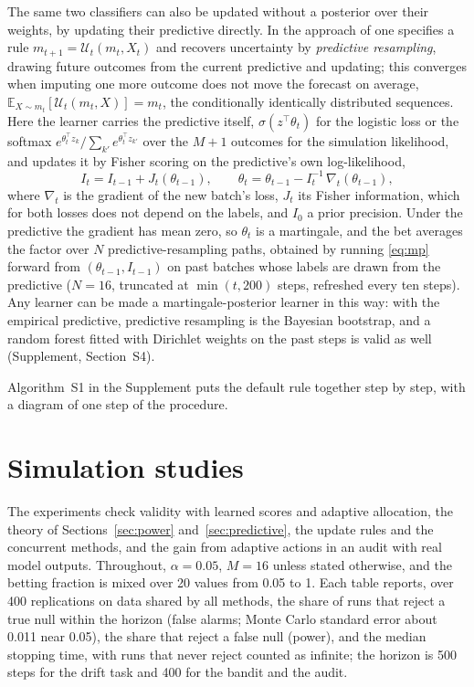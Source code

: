 \documentclass[12pt]{article}
\newcommand{\E}{\mathbb{E}}
\theoremstyle{remark}
\begin{document}
The same two classifiers can also be updated without a posterior over their
weights, by updating their predictive directly. In the approach of
\citet{fong2023martingale} one specifies a rule
$m_{t+1} = \mathcal U_t(m_t, X_t)$ and recovers uncertainty by
\emph{predictive resampling}, drawing future outcomes from the current
predictive and updating; this converges when imputing one more outcome does
not move the forecast on average, $\E_{X \sim m_t}[\mathcal U_t(m_t, X)] = m_t$,
the conditionally identically distributed sequences.
Here the learner carries the predictive itself, $\sigma(z^\top\theta_t)$ for
the logistic loss or the softmax $e^{\theta_t^\top z_k}/\sum_{k'} e^{\theta_t^\top z_{k'}}$
over the $M+1$ outcomes for the simulation likelihood, and updates it by
Fisher scoring on the predictive's own log-likelihood,
\begin{equation}\label{eq:mp}
I_t = I_{t-1} + J_t(\theta_{t-1}), \qquad
\theta_t = \theta_{t-1} - I_t^{-1}\, \nabla_t(\theta_{t-1}),
\end{equation}
where $\nabla_t$ is the gradient of the new batch's loss, $J_t$ its Fisher
information, which for both losses does not depend on the labels, and $I_0$ a
prior precision. Under the predictive the gradient has mean zero, so
$\theta_t$ is a martingale, and the bet averages the factor over $N$
predictive-resampling paths, obtained by running \eqref{eq:mp} forward from
$(\theta_{t-1}, I_{t-1})$ on past batches whose labels are drawn from the
predictive ($N = 16$, truncated at $\min(t, 200)$ steps, refreshed every ten
steps). Any learner can be made a martingale-posterior learner in this way:
with the empirical predictive, predictive resampling is the Bayesian
bootstrap, and a random forest fitted with Dirichlet weights on the past steps
is valid as well (Supplement, Section~S4).

Algorithm~S1 in the Supplement puts the default rule together step by step,
with a diagram of one step of the procedure.

\section{Simulation studies}\label{sec:experiments}

The experiments check validity with learned scores and adaptive allocation,
the theory of Sections~\ref{sec:power} and~\ref{sec:predictive}, the update
rules and the concurrent methods, and the gain from adaptive actions in an
audit with real model outputs. Throughout, $\alpha = 0.05$,
$M = 16$ unless stated otherwise, and the betting fraction is mixed over 20
values from 0.05 to 1. Each table reports, over 400 replications on data
shared by all methods, the share of runs that reject a true null within the
horizon (false alarms; Monte Carlo standard error about 0.011 near 0.05), the
share that reject a false null (power), and the median stopping time, with
runs that never reject counted as infinite; the horizon is 500 steps for the
drift task and 400 for the bandit and the audit.
\end{document}
